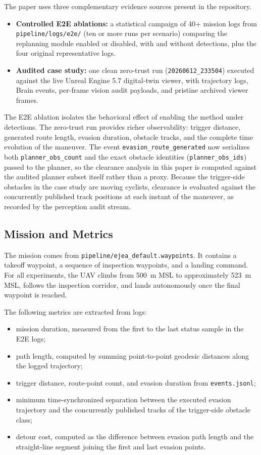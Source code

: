 \documentclass[a4paper,11pt]{article}
\begin{document}
The paper uses three complementary evidence sources present in the repository.
\begin{itemize}[leftmargin=1.3em]
    \item \textbf{Controlled E2E ablations:} a statistical campaign of 40+ mission logs from \texttt{pipeline/logs/e2e/} (ten or more runs per scenario) comparing the replanning module enabled or disabled, with and without detections, plus the four original representative logs.
    \item \textbf{Audited case study:} one clean zero-trust run (\texttt{20260612\_233504}) executed against the live Unreal Engine 5.7 digital-twin viewer, with trajectory logs, Brain events, per-frame vision audit payloads, and pristine archived viewer frames.
\end{itemize}

The E2E ablation isolates the behavioral effect of enabling the method under detections. The zero-trust run provides richer observability: trigger distance, generated route length, evasion duration, obstacle tracks, and the complete time evolution of the maneuver. The event \texttt{evasion\_route\_generated} now serializes both \texttt{planner\_obs\_count} and the exact obstacle identities (\texttt{planner\_obs\_ids}) passed to the planner, so the clearance analysis in this paper is computed against the audited planner subset itself rather than a proxy. Because the trigger-side obstacles in the case study are moving cyclists, clearance is evaluated against the concurrently published track positions at each instant of the maneuver, as recorded by the perception audit stream.

\subsection{Mission and Metrics}

The mission comes from \texttt{pipeline/ejea\_default.waypoints}. It contains a takeoff waypoint, a sequence of inspection waypoints, and a landing command. For all experiments, the UAV climbs from \SI{500}{\meter} MSL to approximately \SI{523}{\meter} MSL, follows the inspection corridor, and lands autonomously once the final waypoint is reached.

The following metrics are extracted from logs:
\begin{itemize}[leftmargin=1.3em]
    \item mission duration, measured from the first to the last status sample in the E2E logs;
    \item path length, computed by summing point-to-point geodesic distances along the logged trajectory;
    \item trigger distance, route-point count, and evasion duration from \texttt{events.jsonl};
    \item minimum time-synchronized separation between the executed evasion trajectory and the concurrently published tracks of the trigger-side obstacle class;
    \item detour cost, computed as the difference between evasion path length and the straight-line segment joining the first and last evasion points.
\end{itemize}
\end{document}

